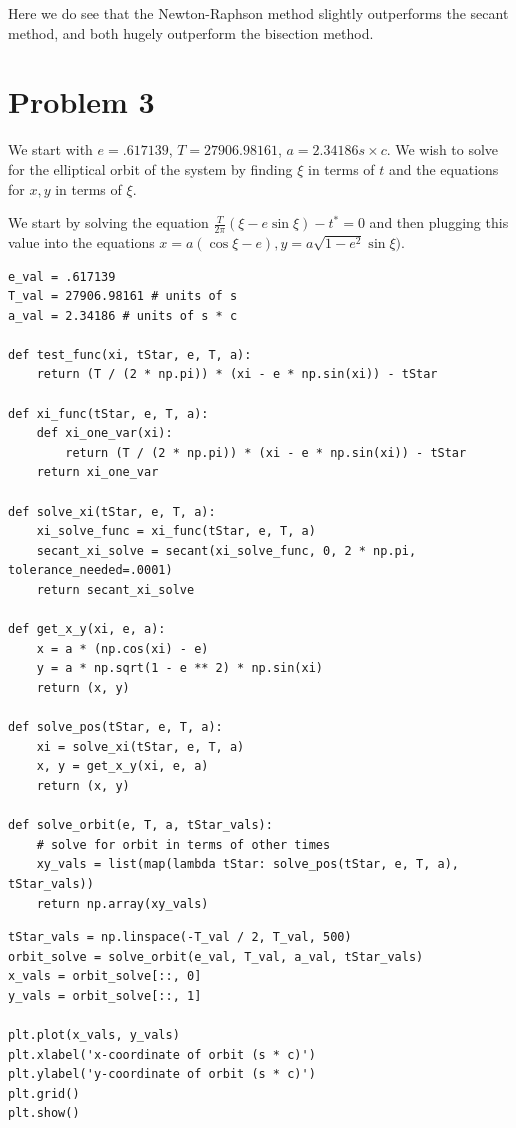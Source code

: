 \documentclass[11pt]{article}
\begin{document}
Here we do see that the Newton-Raphson method slightly outperforms the secant
method, and both hugely outperform the bisection method.

\section*{Problem 3}
\label{sec-3}
We start with $e = .617139$, $T = 27906.98161$, $a = 2.34186 s \times
c$. We wish to solve for the elliptical orbit of the system by finding $\xi$ in
terms of $t$ and the equations for ${x, y}$ in terms of $\xi$.

We start by solving the equation $\frac{T}{2 \pi} (\xi - e \sin{\xi}) - t^* = 0$
and then plugging this value into the equations $x = a(\cos{\xi} - e), y = a
\sqrt{1 - e^2} \sin{\xi})$.

\begin{verbatim}
e_val = .617139
T_val = 27906.98161 # units of s
a_val = 2.34186 # units of s * c

def test_func(xi, tStar, e, T, a):
    return (T / (2 * np.pi)) * (xi - e * np.sin(xi)) - tStar

def xi_func(tStar, e, T, a):
    def xi_one_var(xi):
        return (T / (2 * np.pi)) * (xi - e * np.sin(xi)) - tStar
    return xi_one_var

def solve_xi(tStar, e, T, a):
    xi_solve_func = xi_func(tStar, e, T, a)
    secant_xi_solve = secant(xi_solve_func, 0, 2 * np.pi, tolerance_needed=.0001)
    return secant_xi_solve

def get_x_y(xi, e, a):
    x = a * (np.cos(xi) - e)
    y = a * np.sqrt(1 - e ** 2) * np.sin(xi)
    return (x, y)

def solve_pos(tStar, e, T, a):
    xi = solve_xi(tStar, e, T, a)
    x, y = get_x_y(xi, e, a)
    return (x, y)

def solve_orbit(e, T, a, tStar_vals):
    # solve for orbit in terms of other times
    xy_vals = list(map(lambda tStar: solve_pos(tStar, e, T, a), tStar_vals))
    return np.array(xy_vals)
\end{verbatim}


\begin{verbatim}
tStar_vals = np.linspace(-T_val / 2, T_val, 500)
orbit_solve = solve_orbit(e_val, T_val, a_val, tStar_vals)
x_vals = orbit_solve[::, 0]
y_vals = orbit_solve[::, 1]

plt.plot(x_vals, y_vals)
plt.xlabel('x-coordinate of orbit (s * c)')
plt.ylabel('y-coordinate of orbit (s * c)')
plt.grid()
plt.show()
\end{verbatim}
\end{document}
